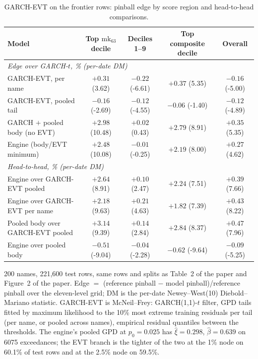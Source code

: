 \documentclass[11pt]{article}
\begin{document}
\begin{table}[htbp]
\centering
\begin{threeparttable}
\caption{GARCH-EVT on the frontier rows: pinball edge by score region and head-to-head comparisons.}
\label{tab:garchevt-frontier}
\small
\begin{tabular}{lcccc}
\toprule
Model & Top $\mathrm{mk}_{63}$ decile & Deciles 1--9 & Top composite decile & Overall \\
\midrule
\multicolumn{5}{l}{\emph{Edge over GARCH-$t$, \% (per-date DM)}} \\
GARCH-EVT, per name & $+0.31$ (3.62) & $-0.22$ (-6.61) & $+0.37$ (5.35) & $-0.16$ (-5.00) \\
GARCH-EVT, pooled tail & $-0.16$ (-2.69) & $-0.12$ (-4.55) & $-0.06$ (-1.40) & $-0.12$ (-4.89) \\
GARCH $+$ pooled body (no EVT) & $+2.98$ (10.48) & $+0.02$ (0.43) & $+2.79$ (8.91) & $+0.35$ (5.35) \\
Engine (body/EVT minimum) & $+2.48$ (10.08) & $-0.01$ (-0.25) & $+2.19$ (8.00) & $+0.27$ (4.62) \\
\midrule
\multicolumn{5}{l}{\emph{Head-to-head, \% (per-date DM)}} \\
Engine over GARCH-EVT pooled & $+2.64$ (8.91) & $+0.10$ (2.47) & $+2.24$ (7.51) & $+0.39$ (7.66) \\
Engine over GARCH-EVT per name & $+2.18$ (9.63) & $+0.21$ (4.63) & $+1.82$ (7.39) & $+0.43$ (8.22) \\
Pooled body over GARCH-EVT pooled & $+3.14$ (9.39) & $+0.14$ (2.84) & $+2.84$ (8.37) & $+0.47$ (7.96) \\
Engine over pooled body & $-0.51$ (-9.04) & $-0.04$ (-2.28) & $-0.62$ (-9.64) & $-0.09$ (-5.25) \\
\bottomrule
\end{tabular}
\begin{tablenotes}\footnotesize
\item 200 names, 221,600 test rows, same rows and splits as Table~2 of the paper and Figure~2 of the paper. Edge $=$ (reference pinball $-$ model pinball)/reference pinball over the eleven-level grid; DM is the per-date Newey--West(10) Diebold--Mariano statistic. GARCH-EVT is McNeil--Frey: GARCH(1,1)-$t$ filter, GPD tails fitted by maximum likelihood to the 10\% most extreme training residuals per tail (per name, or pooled across names), empirical residual quantiles between the thresholds. The engine's pooled GPD at $p_0=0.025$ has $\hat\xi=0.298$, $\hat\beta=0.639$ on 6075 exceedances; the EVT branch is the tighter of the two at the 1\% node on 60.1\% of test rows and at the 2.5\% node on 59.5\%.
\end{tablenotes}
\end{threeparttable}
\end{table}
\end{document}
